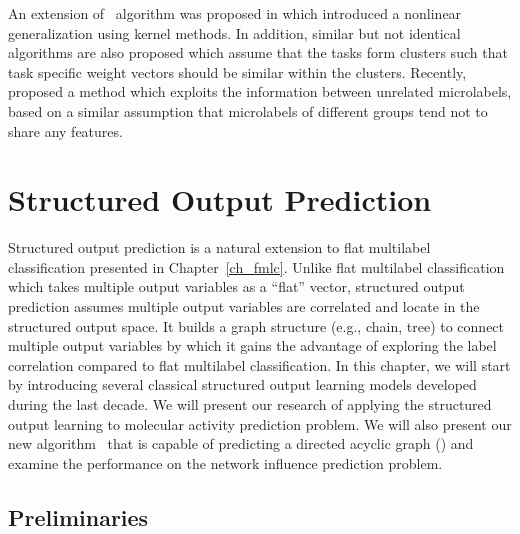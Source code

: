 {An extension of \mtl\ algorithm was proposed in \citep{Argyriou08convex} which introduced a nonlinear generalization using kernel methods.
In addition, similar but not identical algorithms \citep{Argyriou08an,Jacob09cluster} are also proposed which assume that the tasks form clusters such that task specific weight vectors should be similar within the clusters.
Recently, \citet{Paredes12exploit} proposed a method which exploits the information between unrelated microlabels, based on a similar assumption that microlabels of different groups tend not to share any features.




%
%
\chapter{Structured Output Prediction} \label{ch_sop}

Structured output prediction is a natural extension to flat multilabel classification presented in Chapter~\ref{ch_fmlc}.
Unlike flat multilabel classification which takes multiple output variables as a ``flat'' vector, structured output prediction assumes multiple output variables are correlated and locate in the structured output space.
It builds a graph structure (e.g., chain, tree) to connect multiple output variables by which it gains the advantage of exploring the label correlation compared to flat multilabel classification.
In this chapter, we will start by introducing several classical structured output learning models developed during the last decade.
We will present our research of applying the structured output learning to molecular activity prediction problem.
We will also present our new algorithm \spin\ that is capable of predicting a directed acyclic graph (\daggraph) and examine the performance on the network influence prediction problem.



%
%
\section{Preliminaries}

}
